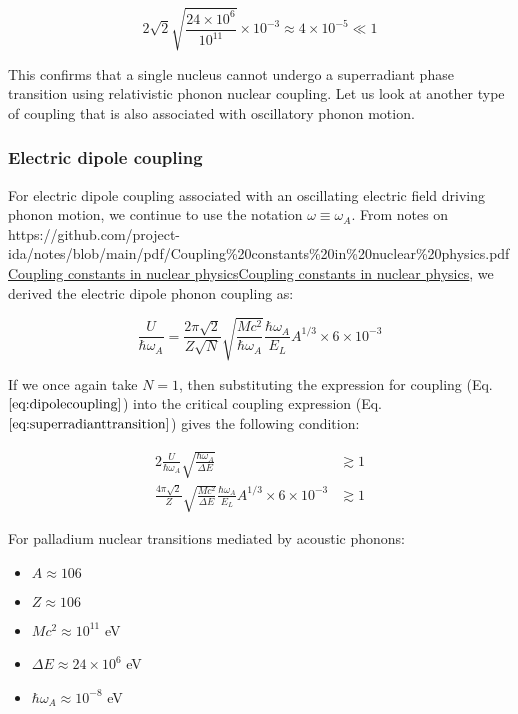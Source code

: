 \documentclass[
]{article}
\let\oldhref\href
\renewcommand{\href}[2]{\ifx#1\urlprefix\oldhref{#1}{#2}\else\uline{\oldhref{#1}{#2}}\fi}
\renewcommand{\[}{\begin{equation}}
\renewcommand{\]}{\end{equation}}
\providecommand{\tightlist}{%
  \setlength{\itemsep}{0pt}\setlength{\parskip}{0pt}}
\begin{document}
\[
2\sqrt{2} \sqrt{\frac{24\times10^6}{10^{11}}}  \times 10^{-3} \approx 4 \times 10^{-5} \ll 1
\label{eq:criticalphononcouplingexplicitnumbers}
\]

This confirms that a single nucleus cannot undergo a superradiant phase
transition using relativistic phonon nuclear coupling. Let us look at
another type of coupling that is also associated with oscillatory phonon
motion.

\subsubsection{Electric dipole coupling}\label{electric-dipole-coupling}

For electric dipole coupling associated with an oscillating electric
field driving phonon motion, we continue to use the notation
\(\omega \equiv \omega_A\). From notes on
\href{https://github.com/project-ida/notes/blob/main/pdf/Coupling\%20constants\%20in\%20nuclear\%20physics.pdf}{Coupling
constants in nuclear physics}, we derived the electric dipole phonon
coupling as:

\[
\frac{U}{\hbar \omega_A} = \frac{2\pi\sqrt{2}}{Z \sqrt{N}} \sqrt{\frac{M c^2}{\hbar \omega_A}} \frac{\hbar \omega_A}{E_L} A^{1/3} \times 6 \times 10^{-3}
\label{eq:dipolecoupling}
\]

If we once again take \(N=1\), then substituting the expression for
coupling (Eq. \(\ref{eq:dipolecoupling}\)) into the critical coupling
expression (Eq. \(\ref{eq:superradianttransition}\)) gives the following
condition:

\[
\begin{aligned}
2\frac{U}{\hbar\omega_A}\sqrt{\frac{\hbar\omega_A}{\Delta E}} &\gtrsim 1 \\
\frac{4\pi\sqrt{2}}{Z} \sqrt{\frac{M c^2}{\Delta E}} \frac{\hbar \omega_A}{E_L} A^{1/3} \times 6 \times 10^{-3} &\gtrsim 1
\end{aligned}
\label{eq:criticaldipolecouplingexplicit}
\]

For palladium nuclear transitions mediated by acoustic phonons:

\begin{itemize}
\tightlist
\item
  \(A \approx 106\)
\item
  \(Z \approx 106\)
\item
  \(M c^2 \approx 10^{11}\) eV
\item
  \(\Delta E \approx 24 \times 10^{6}\) eV\\
\item
  \(\hbar \omega_A \approx 10^{-8}\) eV
\end{itemize}
\end{document}
